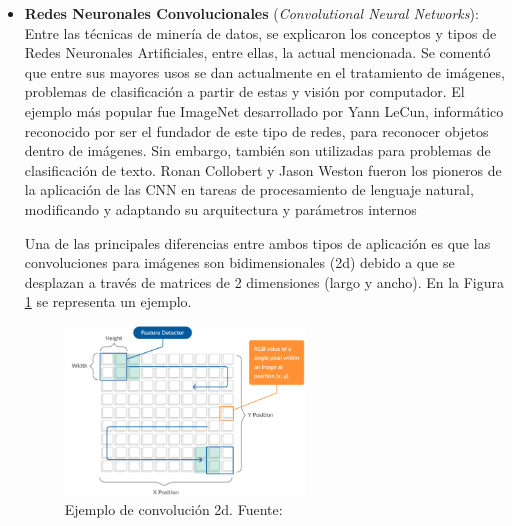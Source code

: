 \begin{itemize}
	\item \textbf{Redes Neuronales Convolucionales} (\textit{Convolutional Neural Networks}): Entre las técnicas de minería de datos, se explicaron los conceptos y tipos de Redes Neuronales Artificiales, entre ellas, la actual mencionada. Se comentó que entre sus mayores usos se dan actualmente en el tratamiento de imágenes, problemas de clasificación a partir de estas y visión por computador. El ejemplo más popular fue ImageNet desarrollado por Yann LeCun, informático reconocido por ser el fundador de este tipo de redes, para reconocer objetos dentro de imágenes. Sin embargo, también son utilizadas para problemas de clasificación de texto. Ronan Collobert y Jason Weston fueron los pioneros de la aplicación de las CNN en tareas de procesamiento de lenguaje natural, modificando y adaptando su arquitectura y parámetros internos \parencite{bk_kamath2019deeplearning_nlp_sr}
	
	Una de las principales diferencias entre ambos tipos de aplicación es que las convoluciones para imágenes son bidimensionales (2d) debido a que se desplazan a través de matrices de 2 dimensiones (largo y ancho). En la Figura \ref{2:fig40} se representa un ejemplo.
	\begin{figure}[h]
		\begin{center}
			\includegraphics[width=0.6\textwidth]{2/figures/2D-convolutional-example.png}
			\caption{Ejemplo de convolución 2d. Fuente: \cite{tec_missinglink_conv1d}}
			\label{2:fig40}
		\end{center}
	\end{figure}
	

\end{itemize}
